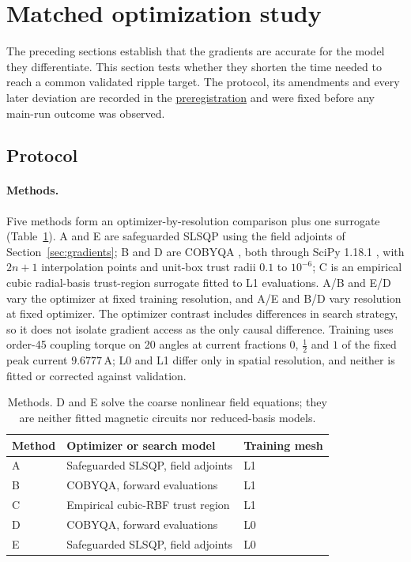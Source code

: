 \section{Matched optimization study}\label{sec:optimization}
The preceding sections establish that the gradients are accurate for the
model they differentiate. This section tests whether they shorten the time
needed to reach a common validated ripple target. The protocol, its
amendments and every later deviation are recorded in the
\href{https://github.com/rjwalters/geode-fem/issues/1185}{preregistration}
and were fixed before any main-run outcome was observed.

\subsection{Protocol}
\paragraph{Methods.}
Five methods form an optimizer-by-resolution comparison plus one
surrogate (Table~\ref{tab:methods}). A and E are safeguarded SLSQP \citep{kraft1988} using
the field adjoints of Section~\ref{sec:gradients}; B and D are COBYQA
\citep{ragonneau2022}, both through SciPy 1.18.1 \citep{virtanen2020scipy}, with $2n+1$ interpolation points and unit-box trust
radii $0.1$ to $10^{-6}$; C is an empirical cubic radial-basis trust-region
surrogate fitted to L1 evaluations. A/B and E/D vary the optimizer at fixed
training resolution, and A/E and B/D vary resolution at fixed optimizer.
The optimizer contrast includes differences in search strategy, so it does
not isolate gradient access as the only causal difference. Training uses
order-45 coupling torque on 20 angles at current fractions $0$, $\tfrac12$
and $1$ of the fixed peak current $9.6777\,\mathrm{A}$; L0 and L1 differ only
in spatial resolution, and neither is fitted or corrected against validation.

\begin{table}[H]\centering\small
\caption{Methods. D and E solve the coarse nonlinear field equations; they
are neither fitted magnetic circuits nor reduced-basis models.}
\label{tab:methods}
\begin{tabular}{lll}\toprule
Method & Optimizer or search model & Training mesh\\\midrule
A & Safeguarded SLSQP, field adjoints & L1\\
B & COBYQA, forward evaluations & L1\\
C & Empirical cubic-RBF trust region & L1\\
D & COBYQA, forward evaluations & L0\\
E & Safeguarded SLSQP, field adjoints & L0\\\bottomrule
\end{tabular}
\end{table}

